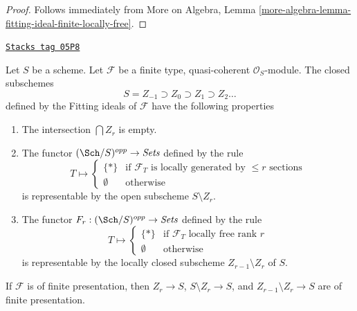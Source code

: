 \begin{proof}
Follows immediately from
More on Algebra, Lemma
\ref{more-algebra-lemma-fitting-ideal-finite-locally-free}.
\end{proof}

\begin{lemma}
\label{divisors-lemma-locally-free-rank-r-pullback}
\href{https://stacks.math.columbia.edu/tag/05P8}{\texttt{Stacks tag 05P8}}

Let $S$ be a scheme. Let $\mathcal{F}$ be a finite type, quasi-coherent
$\mathcal{O}_S$-module. The closed subschemes
$$
S = Z_{-1} \supset Z_0 \supset Z_1 \supset Z_2 \ldots
$$
defined by the Fitting ideals of $\mathcal{F}$ have the following
properties
\begin{enumerate}
\item The intersection $\bigcap Z_r$ is empty.
\item The functor $(\Sch/S)^{opp} \to \textit{Sets}$ defined by the rule
$$
T \longmapsto
\left\{
\begin{matrix}
\{*\} & \text{if }\mathcal{F}_T\text{ is locally generated by }
\leq r\text{ sections} \\
\emptyset & \text{otherwise}
\end{matrix}
\right.
$$
is representable by the open subscheme $S \setminus Z_r$.
\item The functor $F_r : (\Sch/S)^{opp} \to \textit{Sets}$ defined by the rule
$$
T \longmapsto
\left\{
\begin{matrix}
\{*\} & \text{if }\mathcal{F}_T\text{ locally free rank }r\\
\emptyset & \text{otherwise}
\end{matrix}
\right.
$$
is representable by the locally closed subscheme $Z_{r - 1} \setminus Z_r$
of $S$.
\end{enumerate}
If $\mathcal{F}$ is of finite presentation, then
$Z_r \to S$, $S \setminus Z_r \to S$, and $Z_{r - 1} \setminus Z_r \to S$
are of finite presentation.
\end{lemma}


